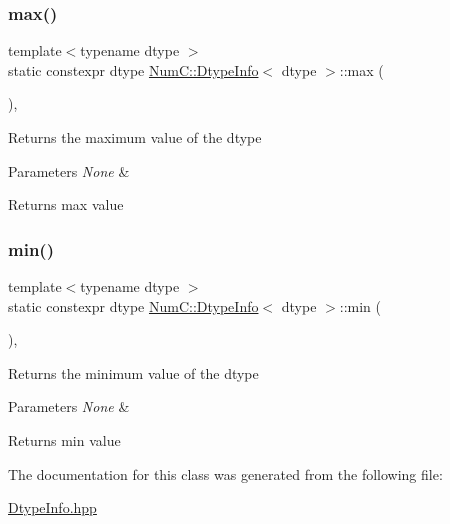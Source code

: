 \subsubsection{\texorpdfstring{max()}{max()}}
{\footnotesize\ttfamily template$<$typename dtype $>$ \\
static constexpr dtype \mbox{\hyperlink{class_num_c_1_1_dtype_info}{Num\+C\+::\+Dtype\+Info}}$<$ dtype $>$\+::max (\begin{DoxyParamCaption}{ }\end{DoxyParamCaption})\hspace{0.3cm}{\ttfamily [inline]}, {\ttfamily [static]}}

Returns the maximum value of the dtype


\begin{DoxyParams}{Parameters}
{\em None} & \\
\hline
\end{DoxyParams}
\begin{DoxyReturn}{Returns}
max value 
\end{DoxyReturn}
\mbox{\label{class_num_c_1_1_dtype_info_a0203027ae62ac389c1794cfe22e990a1}} 
\subsubsection{\texorpdfstring{min()}{min()}}
{\footnotesize\ttfamily template$<$typename dtype $>$ \\
static constexpr dtype \mbox{\hyperlink{class_num_c_1_1_dtype_info}{Num\+C\+::\+Dtype\+Info}}$<$ dtype $>$\+::min (\begin{DoxyParamCaption}{ }\end{DoxyParamCaption})\hspace{0.3cm}{\ttfamily [inline]}, {\ttfamily [static]}}

Returns the minimum value of the dtype


\begin{DoxyParams}{Parameters}
{\em None} & \\
\hline
\end{DoxyParams}
\begin{DoxyReturn}{Returns}
min value 
\end{DoxyReturn}


The documentation for this class was generated from the following file\+:\begin{DoxyCompactItemize}
\item 
\mbox{\hyperlink{_dtype_info_8hpp}{Dtype\+Info.\+hpp}}\end{DoxyCompactItemize}
